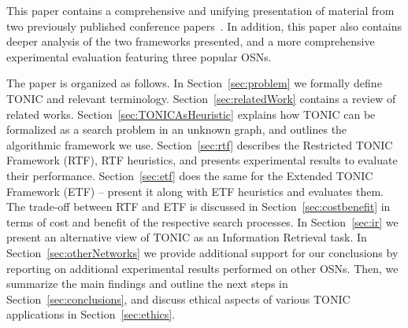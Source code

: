 \documentclass[prodmode,acmtecs]{acmsmall} %
\newcommand{\note}[2]{\textbf{\textsc{#1} says: \textit{#2}}}
\begin{document}




This paper contains a comprehensive and unifying presentation of material from two previously published conference papers~\cite{stern2013tonic,samama2014extended}. In addition, this paper also contains deeper analysis of the two frameworks presented, and a more comprehensive experimental evaluation featuring three popular OSNs. 



The paper is organized as follows. In Section~\ref{sec:problem} we formally define TONIC and relevant terminology. Section~\ref{sec:relatedWork} contains a review of related works. Section~\ref{sec:TONICAsHeuristic} explains how TONIC can be formalized as a search problem in an unknown graph, and outlines the algorithmic framework we use. Section~\ref{sec:rtf} describes the Restricted TONIC Framework (RTF), RTF heuristics, and presents experimental results to evaluate their performance. Section~\ref{sec:etf} does the same for the Extended TONIC Framework (ETF) -- present it along with ETF heuristics and evaluates them. The trade-off between RTF and ETF is discussed in Section~\ref{sec:costbenefit} in terms of cost and benefit of the respective search processes. In Section~\ref{sec:ir} we present an alternative view of TONIC as an Information Retrieval task. In Section~\ref{sec:otherNetworks} we provide additional support for our conclusions by reporting on additional experimental results performed on other OSNs. Then, we summarize the main findings and outline the next steps in Section~\ref{sec:conclusions}, and discuss ethical aspects of various TONIC applications in Section~\ref{sec:ethics}. 


\end{document}

